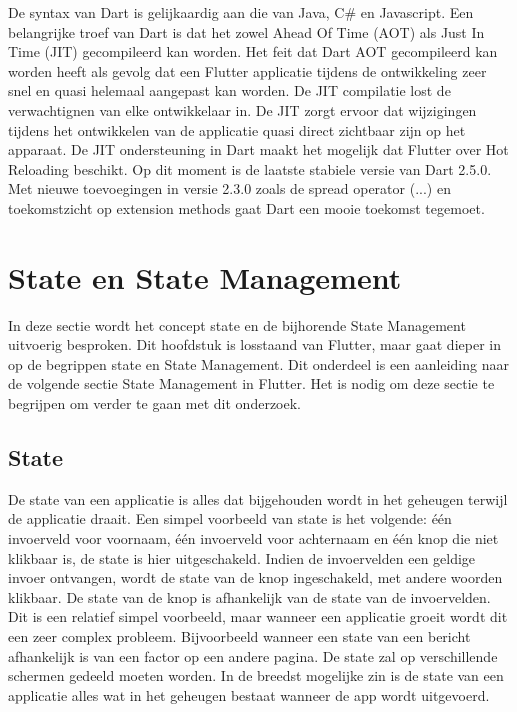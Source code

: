 De syntax van Dart is gelijkaardig aan die van Java, C\# en Javascript.
Een belangrijke troef van Dart is dat het zowel Ahead Of Time (AOT) als Just In Time (JIT) gecompileerd kan worden. Het feit dat Dart AOT gecompileerd kan worden heeft als gevolg dat een Flutter applicatie tijdens de ontwikkeling zeer snel en quasi helemaal aangepast kan worden.
De JIT compilatie lost de verwachtignen van elke ontwikkelaar in. De JIT zorgt ervoor dat wijzigingen tijdens het ontwikkelen van de applicatie quasi direct zichtbaar zijn op het apparaat. De JIT ondersteuning in Dart maakt het mogelijk dat Flutter over Hot Reloading beschikt. \autocite{Leler2017a}
\newline
Op dit moment is de laatste stabiele versie van Dart 2.5.0. Met nieuwe toevoegingen in versie 2.3.0 zoals de spread operator (...) en toekomstzicht op extension methods gaat Dart een mooie toekomst tegemoet. \autocite{Thomsen2019}

\section{State en State Management}
In deze sectie wordt het concept state en de bijhorende State Management uitvoerig besproken. Dit hoofdstuk is losstaand van Flutter, maar gaat dieper in op de begrippen state en State Management. Dit onderdeel is een aanleiding naar de volgende sectie State Management in Flutter. Het is nodig om deze sectie te begrijpen om verder te gaan met dit onderzoek.

\subsection{State}
De state van een applicatie is alles dat bijgehouden wordt in het geheugen terwijl de applicatie draait. \textcite{Coninck2019}
Een simpel voorbeeld van state is het volgende: één invoerveld voor voornaam, één invoerveld voor achternaam en één knop die niet klikbaar is, de state is hier uitgeschakeld. Indien de invoervelden een geldige invoer ontvangen, wordt de state van de knop ingeschakeld, met andere woorden klikbaar. De state van de knop is afhankelijk van de state van de invoervelden. Dit is een relatief simpel voorbeeld, maar wanneer een applicatie groeit wordt dit een zeer complex probleem. Bijvoorbeeld wanneer een state van een bericht afhankelijk is van een factor op een andere pagina. De state zal op verschillende schermen gedeeld moeten worden.
In de breedst mogelijke zin is de state van een applicatie alles wat in het geheugen bestaat wanneer de app wordt uitgevoerd. 

